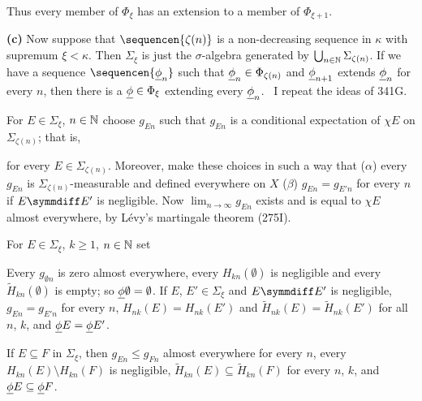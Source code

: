 {\medskip

 Thus every member of $\Phi_{\xi}$ has an extension to a
member of $\Phi_{\xi+1}$.

\medskip

{\bf (c)} Now suppose that $\sequencen{\zeta(n)}$ is a non-decreasing
sequence in $\kappa$ with supremum $\xi<\kappa$.   Then $\Sigma_{\xi}$
is just the $\sigma$-algebra generated by
$\bigcup_{n\in\Bbb N}\Sigma_{\zeta(n)}$.   If we have a sequence
$\sequencen{\undphi_n}$
such that ${\underline{\phi}}_n\in\Phi_{\zeta(n)}$ and ${\underline{\phi}}_{n+1}$ extends
${\underline{\phi}}_n$ for every $n$, then there is a ${\underline{\phi}}\in\Phi_{\xi}$
extending every ${\underline{\phi}}_n$.   \Prf\ I repeat the ideas of 341G.

\medskip

 For $E\in\Sigma_{\xi}$, $n\in\Bbb N$ choose
$g_{En}$ such that $g_{En}$ is a conditional
expectation of $\chi E$ on $\Sigma_{\zeta(n)}$;  that is,


\noindent for every $E\in\Sigma_{\zeta(n)}$.   Moreover, make these
choices in such a way that ($\alpha$) every $g_{En}$ is
$\Sigma_{\zeta(n)}$-measurable and defined everywhere on $X$ ($\beta$)
$g_{En}=g_{E'n}$ for every $n$ if $E\symmdiff E'$ is negligible.
Now $\lim_{n\to\infty}g_{En}$ exists and is equal
to $\chi E$ almost everywhere, by L\'evy's martingale
theorem (275I).

\medskip

 For $E\in\Sigma_{\xi}$, $k\ge 1$, $n\in\Bbb N$ set



\medskip

 Every $g_{\emptyset n}$ is zero almost
everywhere, every $H_{kn}(\emptyset)$ is negligible and every
$\tilde H_{kn}(\emptyset)$
is empty;  so ${\underline{\phi}}\emptyset=\emptyset$.   If $E$,
$E'\in\Sigma_{\xi}$ and $E\symmdiff E'$ is negligible, $g_{En}=g_{E'n}$
for every $n$, $H_{nk}(E)=H_{nk}(E')$ and
$\tilde H_{nk}(E)=\tilde H_{nk}(E')$ for all $n$, $k$,
and ${\underline{\phi}} E={\underline{\phi}} E'$.

\medskip

 If $E\subseteq F$ in $\Sigma_{\xi}$, then $g_{En}\le
g_{Fn}$ almost everywhere for every $n$, every $H_{kn}(E)\setminus
H_{kn}(F)$ is negligible, $\tilde H_{kn}(E)\subseteq\tilde H_{kn}(F)$
for every $n$, $k$, and ${\underline{\phi}} E\subseteq {\underline{\phi}} F$.

}
